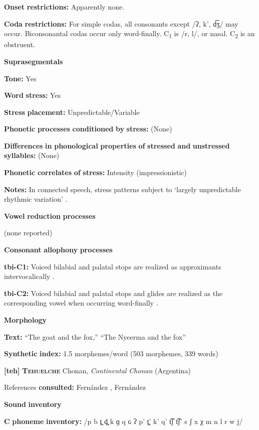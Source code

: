 \textbf{Onset} \textbf{restrictions:} Apparently none.

\textbf{Coda} \textbf{restrictions:} For simple codas, all consonants except /ʔ, k’, d͡ʒ/ may occur. Biconsonantal codas occur only word-finally. C\textsubscript{1} is /r, l/, or nasal. C\textsubscript{2} is an obstruent.

\textbf{Suprasegmentals}

\textbf{Tone:} Yes

\textbf{Word} \textbf{stress:} Yes

\textbf{Stress} \textbf{placement:} Unpredictable/Variable

\textbf{Phonetic} \textbf{processes} \textbf{conditioned} \textbf{by} \textbf{stress:} (None)

\textbf{Differences} \textbf{in} \textbf{phonological} \textbf{properties} \textbf{of} \textbf{stressed} \textbf{and} \textbf{unstressed} \textbf{syllables:} (None)

\textbf{Phonetic} \textbf{correlates} \textbf{of} \textbf{stress:} Intensity (impressionistic)

\textbf{Notes:} In connected speech, stress patterns subject to ‘largely unpredictable rhythmic variation’ \citep[12-13]{Crewe1975}.

\textbf{Vowel} \textbf{reduction} \textbf{processes}

(none reported)

\textbf{Consonant} \textbf{allophony} \textbf{processes}

\textbf{tbi-C1:} Voiced bilabial and palatal stops are realized as approximants intervocalically \citep[25]{Stirtz2011}.

\textbf{tbi-C2:} Voiced bilabial and palatal stops and glides are realized as the corresponding vowel when occurring word-finally \citep{Stirtz2011}.

\textbf{Morphology}

\textbf{Text:} “The goat and the fox,” “The Nyeerma and the fox” \citep[319-326]{Stirtz2011}

\textbf{Synthetic} \textbf{index:} 1.5 morphemes/word (503 morphemes, 339 words)

\textbf{[teh]}   \textbf{\textsc{Tehuelche}}  Chonan, \textit{Continental} \textit{Chonan} (Argentina)

References \textbf{consulted:} Fernández \citet{Garay1998}, Fernández \citet{GarayHernández2006}

\textbf{Sound} \textbf{inventory}

\textbf{C} \textbf{phoneme} \textbf{inventory:} /p b t̪ d̪ k ɡ q ɢ ʔ p’ t̪’ k’ q’ t͡ʃ t͡ʃ’ s ʃ x χ m n l r w j/

